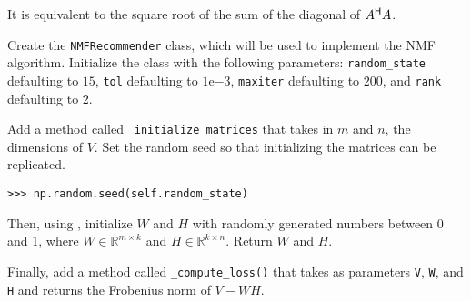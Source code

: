 It is equivalent to the square root of the sum of the diagonal of $A^{\mathsf H} A$.



\begin{problem}
Create the \texttt{NMFRecommender} class, which will be used to implement the NMF algorithm.
Initialize the class with the following parameters: 
\texttt{random\_state} defaulting to $15$,
\texttt{tol} defaulting to $1\mathrm{e}{-3}$, \texttt{maxiter} defaulting to $200$, and \texttt{rank} defaulting to $2$.


Add a method called \texttt{\_initialize\_matrices} that takes in $m$ and $n$, the dimensions of $V$.
Set the random seed so that initializing the matrices can be replicated.
\begin{lstlisting}
>>> np.random.seed(self.random_state) 
\end{lstlisting}
Then, using , initialize $W$ and $H$ with randomly generated numbers between 0 and 1, where $W\in\mathbb{R}^{m\times k}$ and $H\in\mathbb{R}^{k\times n}$.
Return $W$ and $H$.

Finally, add a method called \texttt{\_compute\_loss()} that takes as parameters \texttt{V}, \texttt{W}, and \texttt{H} and returns the Frobenius norm of $V-WH$.
\end{problem}

%
%
%



